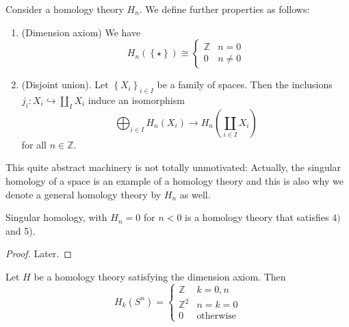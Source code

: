 \begin{ddefinition}\label{further-axioms-of-homology-theories}
    Consider a homology theory $H_n$. We define further properties as follows:
    \begin{enumerate}[1)]
        \item (Dimension axiom) We have 
            \[
                H_n(\left \{\star\right\} ) \cong \begin{cases}
                    \mathbb{Z} & n = 0 \\
                    0 & n \neq 0
                \end{cases}
            \] 
        \item (Disjoint union). Let $\left \{X_i\right\} _{i \in I}$ be a family of spaces. Then the inclusions $j_i: X_i \hookrightarrow \coprod_I X_i$ induce an isomorphism
            \[
                \bigoplus_{i \in I} H_n(X_i) \to  H_n\left(\coprod _{i \in I}X_i\right)
            \] 
            for all $n\in \mathbb{Z}$.
 \end{enumerate}
\end{ddefinition}

\begin{oral}
    This quite abstract machinery is not totally unmotivated: Actually, the singular homology of a space is an example of a homology theory and this is also why we denote a general homology theory by $H_n$ as well.
\end{oral}

\begin{theorem}\label{thm:singular-homology-is-homology-theory}
    Singular homology, with $H_n = 0$ for  $n<0$ is a homology theory that satisfies $4)$ and 5).
\end{theorem}

\begin{proof}
    Later.
\end{proof}

\begin{theorem}\label{thm:homology-of-unit-sphere-for-homology-theory-with-dimension-axiom}
    Let $H$ be a homology theory satisfying the dimension axiom. Then
     \[
         H_k(S^n) = \begin{cases}
             \mathbb{Z} & k = 0,n \\
             \mathbb{Z}^2 & n = k = 0 \\
             0 & \text{otherwise}
         \end{cases}
    \] 
\end{theorem}

